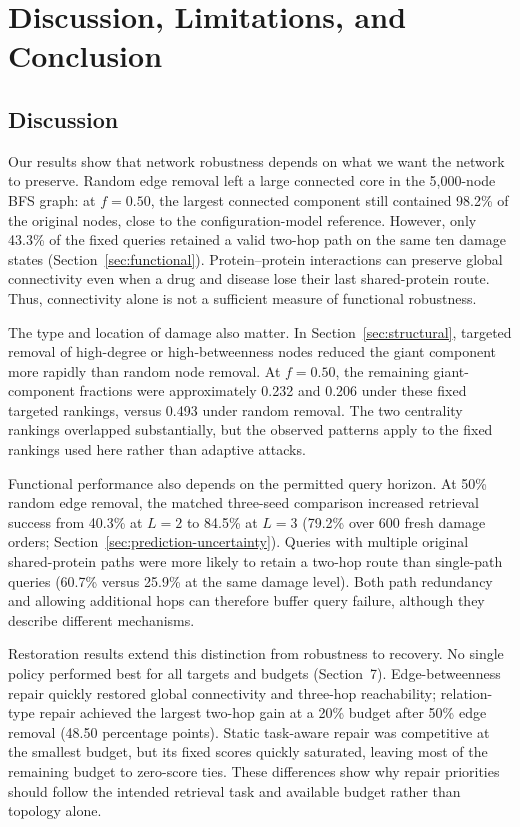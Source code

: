 \section{Discussion, Limitations, and Conclusion}
\label{sec:discussion}

\subsection{Discussion}
Our results show that network robustness depends on what we want the network to preserve. Random edge removal left a large connected core in the 5,000-node BFS graph: at $f=0.50$, the largest connected component still contained 98.2\% of the original nodes, close to the configuration-model reference. However, only 43.3\% of the fixed queries retained a valid two-hop path on the same ten damage states (Section~\ref{sec:functional}). Protein--protein interactions can preserve global connectivity even when a drug and disease lose their last shared-protein route. Thus, connectivity alone is not a sufficient measure of functional robustness.

The type and location of damage also matter. In Section~\ref{sec:structural}, targeted removal of high-degree or high-betweenness nodes reduced the giant component more rapidly than random node removal. At $f=0.50$, the remaining giant-component fractions were approximately 0.232 and 0.206 under these fixed targeted rankings, versus 0.493 under random removal. The two centrality rankings overlapped substantially, but the observed patterns apply to the fixed rankings used here rather than adaptive attacks.

Functional performance also depends on the permitted query horizon. At 50\% random edge removal, the matched three-seed comparison increased retrieval success from 40.3\% at $L=2$ to 84.5\% at $L=3$ (79.2\% over 600 fresh damage orders; Section~\ref{sec:prediction-uncertainty}). Queries with multiple original shared-protein paths were more likely to retain a two-hop route than single-path queries (60.7\% versus 25.9\% at the same damage level). Both path redundancy and allowing additional hops can therefore buffer query failure, although they describe different mechanisms.

Restoration results extend this distinction from robustness to recovery. No single policy performed best for all targets and budgets (Section~7). Edge-betweenness repair quickly restored global connectivity and three-hop reachability; relation-type repair achieved the largest two-hop gain at a 20\% budget after 50\% edge removal (48.50 percentage points). Static task-aware repair was competitive at the smallest budget, but its fixed scores quickly saturated, leaving most of the remaining budget to zero-score ties. These differences show why repair priorities should follow the intended retrieval task and available budget rather than topology alone.

